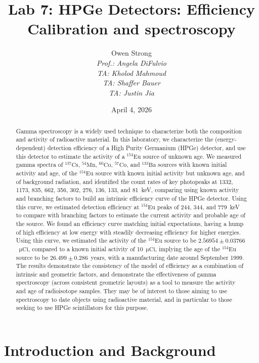 \documentclass[12pt]{article}
\title{Lab 7: HPGe Detectors: Efficiency Calibration and spectroscopy}
\author{Owen Strong \\
\itshape Prof.: Angela DiFulvio\\
\itshape TA: Kholod Mahmoud \\
\itshape TA: Shaffer Bauer \\
\itshape TA: Justin Jia \\
}
\date{April 4, 2026}
\newcommand{\micCi}{$\mathrm{\mu Ci}$\xspace}
\newcommand{\CsSrc}{$\mathrm{^{137}Cs}$\xspace}
\newcommand{\MnSrc}{$\mathrm{^{54}Mn}$\xspace}
\newcommand{\CoSrcA}{$\mathrm{^{60}Co}$\xspace}
\newcommand{\CoSrcB}{$\mathrm{^{57}Co}$\xspace}
\newcommand{\BaSrc}{$\mathrm{^{133}Ba}$\xspace}
\newcommand{\EuSrc}{$\mathrm{^{154}Eu}$\xspace}
\begin{document}
\maketitle
\pagebreak
{\hypersetup{linkcolor=black}\tableofcontents}
\pagebreak
{}
\begin{abstract}
    Gamma spectroscopy is a widely used technique to characterize both the composition and activity of radioactive material.
    In this laboratory, we characterize the (energy-dependent) detection efficiency of a High Purity Germanium (HPGe) detector, and use this detector to estimate the activity of a \EuSrc source of unknown age.
    We measured gamma spectra of \CsSrc, \MnSrc, \CoSrcA, \CoSrcB, and \BaSrc sources with known initial activity and age, of the \EuSrc source with known initial activity but unknown age, and of background radiation, and identified the count rates of key photopeaks at 1332, 1173, 835, 662, 356, 302, 276, 136, 133, and 81~keV, comparing using known activity and branching factors to build an intrinsic efficiency curve of the HPGe detector.
    Using this curve, we estimated detection efficiency at \EuSrc peaks of 244, 344, and 779~keV to compare with branching factors to estimate the current activity and probable age of the source.
    We found an efficiency curve matching initial expectations, having a hump of high efficiency at low energy with steadily decreasing efficiency for higher energies.
    Using this curve, we estimated the activity of the \EuSrc source to be $2.56954 \pm 0.03766$~\micCi, compared to a known initial activity of 10~\micCi, implying the age of the \EuSrc source to be $26.499 \pm 0.286$~years, with a manufacturing date around September 1999.
    The results demonstrate the consistency of the model of efficiency as a combination of intrinsic and geometric factors, and demonstrate the effectiveness of gamma spectroscopy (across consistent geometric layouts) as a tool to measure the activity and age of radioisotope samples.
    They may be of interest to those aiming to use spectroscopy to date objects using radioactive material, and in particular to those seeking to use HPGe scintillators for this purpose.
\end{abstract}

\section{Introduction and Background}
\end{document}
